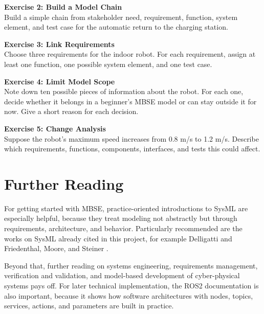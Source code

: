 \begin{uebungbox}
\textbf{Exercise 2: Build a Model Chain}\\
Build a simple chain from stakeholder need, requirement, function, system element, and test case for the automatic return to the charging station.
\end{uebungbox}

\begin{uebungbox}
\textbf{Exercise 3: Link Requirements}\\
Choose three requirements for the indoor robot. For each requirement, assign at least one function, one possible system element, and one test case.
\end{uebungbox}

\begin{uebungbox}
\textbf{Exercise 4: Limit Model Scope}\\
Note down ten possible pieces of information about the robot. For each one, decide whether it belongs in a beginner's MBSE model or can stay outside it for now. Give a short reason for each decision.
\end{uebungbox}

\begin{uebungbox}
\textbf{Exercise 5: Change Analysis}\\
Suppose the robot's maximum speed increases from 0.8 m/s to 1.2 m/s. Describe which requirements, functions, components, interfaces, and tests this could affect.
\end{uebungbox}

\section{Further Reading}
For getting started with MBSE, practice-oriented introductions to SysML are especially helpful, because they treat modeling not abstractly but through requirements, architecture, and behavior. Particularly recommended are the works on SysML already cited in this project, for example Delligatti \cite{delligatti2014} and Friedenthal, Moore, and Steiner \cite{friedenthal2014}.

Beyond that, further reading on systems engineering, requirements management, verification and validation, and model-based development of cyber-physical systems pays off. For later technical implementation, the ROS2 documentation \cite{ros2docs} is also important, because it shows how software architectures with nodes, topics, services, actions, and parameters are built in practice.
